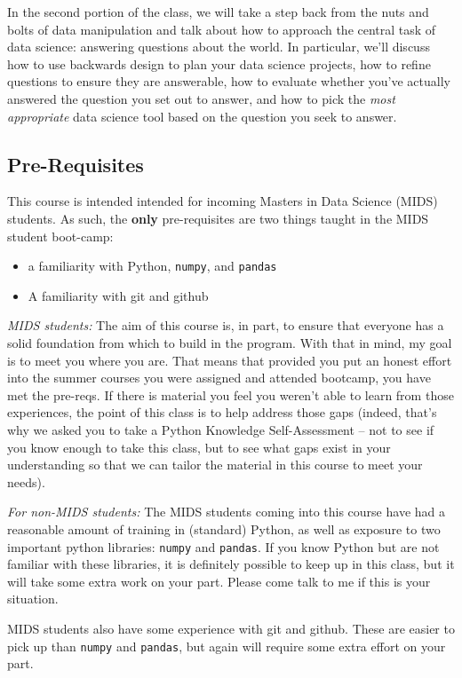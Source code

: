 \documentclass[12pt]{article}
\begin{document}
In the second portion of the class, we will take a step back from the nuts and bolts of data manipulation and talk about how to approach the central task of data science: answering questions about the world. In particular, we'll discuss how to use backwards design to plan your data science projects, how to refine questions to ensure they are answerable, how to evaluate whether you've actually answered the question you set out to answer, and how to pick the \emph{most appropriate} data science tool based on the question you seek to answer.


\subsection{Pre-Requisites}

This course is intended intended for incoming Masters in Data Science (MIDS) students. As such, the \textbf{only} pre-requisites are two things taught in the MIDS student boot-camp:
\begin{itemize}
	\item a familiarity with Python, \texttt{numpy}, and \texttt{pandas}
	\item A familiarity with git and github
\end{itemize}

\emph{MIDS students:}
The aim of this course is, in part, to ensure that everyone has a solid foundation from which to build in the program. With that in mind, my goal is to meet you where you are. That means that provided you put an honest effort into the summer courses you were assigned and attended bootcamp, you have met the pre-reqs. If there is material you feel you weren't able to learn from those experiences, the point of this class is to help address those gaps (indeed, that's why we asked you to take a Python Knowledge Self-Assessment -- not to see if you know enough to take this class, but to see what gaps exist in your understanding so that we can tailor the material in this course to meet your needs).


\emph{For non-MIDS students:}
The MIDS students coming into this course have had a reasonable amount of training in (standard) Python, as well as exposure to two important python libraries: \texttt{numpy} and \texttt{pandas}. If you know Python but are not familiar with these libraries, it is definitely possible to keep up in this class, but it will take some extra work on your part. Please come talk to me if this is your situation.

MIDS students also have some experience with git and github. These are easier to pick up than \texttt{numpy} and \texttt{pandas}, but again will require some extra effort on your part.
\end{document}
